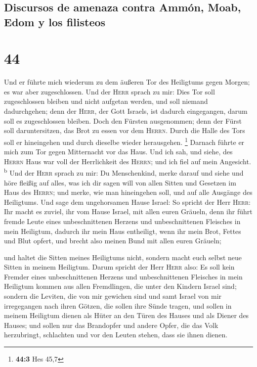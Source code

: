 \hypertarget{discursos-de-amenaza-contra-ammuxf3n-moab-edom-y-los-filisteos}{%
\subsection{Discursos de amenaza contra Ammón, Moab, Edom y los
filisteos}\label{discursos-de-amenaza-contra-ammuxf3n-moab-edom-y-los-filisteos}}

\hypertarget{section-43}{%
\section{44}\label{section-43}}

 Und er führte mich wiederum zu dem äußeren Tor des
Heiligtums gegen Morgen; es war aber zugeschlossen.  Und
der \textsc{Herr} sprach zu mir: Dies Tor soll zugeschlossen bleiben und
nicht aufgetan werden, und soll niemand dadurchgehen; denn der
\textsc{Herr}, der Gott Israels, ist dadurch eingegangen, darum soll es
zugeschlossen bleiben.  Doch den Fürsten ausgenommen; denn
der Fürst soll daruntersitzen, das Brot zu essen vor dem \textsc{Herrn}.
Durch die Halle des Tors soll er hineingehen und durch dieselbe wieder
herausgehen. \footnote{\textbf{44:3} Hes 45,7}  Darnach
führte er mich zum Tor gegen Mitternacht vor das Haus. Und ich sah, und
siehe, des \textsc{Herrn} Haus war voll der Herrlichkeit des
\textsc{Herrn}; und ich fiel auf mein Angesicht. \textsuperscript{b}
 Und der \textsc{Herr} sprach zu mir: Du Menschenkind,
merke darauf und siehe und höre fleißig auf alles, was ich dir sagen
will von allen Sitten und Gesetzen im Haus des \textsc{Herrn}; und
merke, wie man hineingehen soll, und auf alle Ausgänge des Heiligtums.
 Und sage dem ungehorsamen Hause Israel: So spricht der
Herr \textsc{Herr}: Ihr macht es zuviel, ihr vom Hause Israel, mit allen
euren Gräueln,  denn ihr führt fremde Leute eines
unbeschnittenen Herzens und unbeschnittenen Fleisches in mein Heiligtum,
dadurch ihr mein Haus entheiligt, wenn ihr mein Brot, Fettes und Blut
opfert, und brecht also meinen Bund mit allen euren Gräueln;

 und haltet die Sitten meines Heiligtums nicht, sondern
macht euch selbst neue Sitten in meinem Heiligtum.  Darum
spricht der Herr \textsc{Herr} also: Es soll kein Fremder eines
unbeschnittenen Herzens und unbeschnittenen Fleisches in mein Heiligtum
kommen aus allen Fremdlingen, die unter den Kindern Israel sind;
 sondern die Leviten, die von mir gewichen sind und samt
Israel von mir irregegangen nach ihren Götzen, die sollen ihre Sünde
tragen,  und sollen in meinem Heiligtum dienen als Hüter
an den Türen des Hauses und als Diener des Hauses; und sollen nur das
Brandopfer und andere Opfer, die das Volk herzubringt, schlachten und
vor den Leuten stehen, dass sie ihnen dienen.

